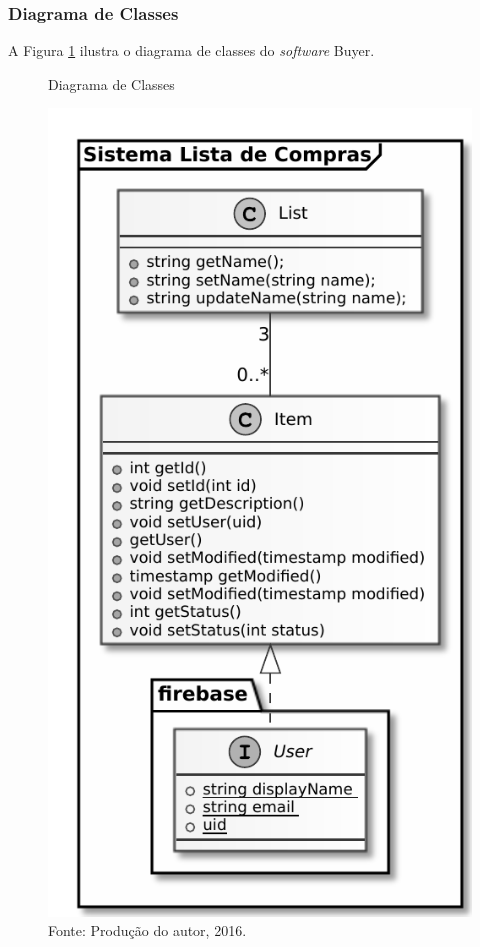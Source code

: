 \documentclass[
	12pt,
	openright,
	oneside, %
	a4paper,
	chapter=TITLE,
	section=TITLE,
	english,
	brazil %
	]{abntex2-udesc}
\begin{document}
\subsubsection{Diagrama de Classes}


A Figura \ref{fig:classes} ilustra o diagrama de classes do \textit{software} Buyer.

\begin{figure}[h]
\caption{Diagrama de Classes}\label{fig:classes}
\centering
\includegraphics{figures/classes.pdf}
\caption*{\footnotesize Fonte: Produção do autor, 2016.}
\end{figure}

\postextual



\end{document}
